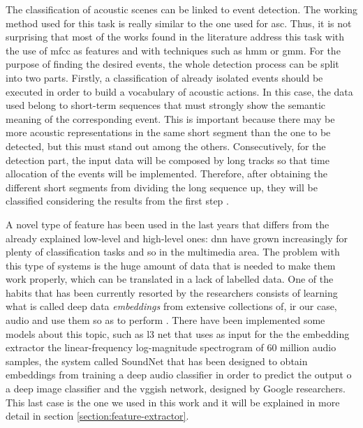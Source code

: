 	The classification of acoustic scenes can be linked to event detection. The working method used for this task is really similar to the one used for \acrshort{asc}. Thus, it is not surprising that most of the works found in the literature address this task with the use of \acrshort{mfcc} as features and with techniques such as \acrshort{hmm} or \acrshort{gmm}. For the purpose of finding the desired events, the whole detection process can be split into two parts. Firstly, a classification of already isolated events should be executed in order to build a vocabulary of acoustic actions. In this case, the data used belong to short-term sequences that must strongly show the semantic meaning of the corresponding event. This is important because there may be more acoustic representations in the same short segment than the one to be detected, but this must stand out among the others.  Consecutively, for the detection part, the input data will be composed by long tracks so that time allocation of the events will be implemented. Therefore, after obtaining the different short segments from dividing the long sequence up, they will be classified considering the results from the first step \cite{Mesaros2010}. 
	
	A novel type of feature has been used in the last years that differs from the already explained low-level and high-level ones: \acrfull{dnn} have grown increasingly for plenty of classification tasks and so in the multimedia area. The problem with this type of systems is the huge amount of data that is needed to make them work properly, which can be translated in a lack of labelled data. One of the habits that has been currently resorted by the researchers consists of learning what is called deep data \textit{embeddings} from extensive collections of, ir our case, audio and use them so as to perform . There have been implemented some models about this topic, such as \acrfull{l3} \cite{Cramer2019} net that uses as input for the the embedding extractor the linear-frequency log-magnitude spectrogram of 60 million audio samples, the system called SoundNet \cite{Aytar2016} that has been designed to obtain embeddings from training a deep audio classifier in order to predict the output o a deep image classifier and the \acrshort{vgg}ish network, designed by Google researchers. This last case is the one we used in this work and it will be explained in more detail in section \ref{section:feature-extractor}. 
	
